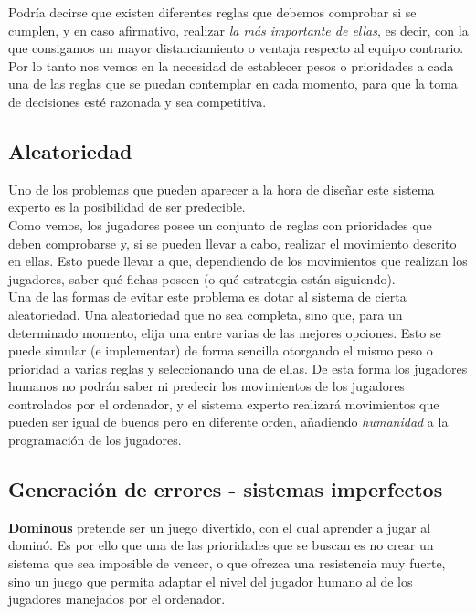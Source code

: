 Podría decirse que existen diferentes reglas que debemos comprobar si se cumplen, y en caso afirmativo, realizar \emph{la
más importante de ellas}, es decir, con la que consigamos un mayor distanciamiento o ventaja respecto al equipo contrario. \\

Por lo tanto nos vemos en la necesidad de establecer pesos o prioridades a cada una de las reglas que se puedan contemplar
en cada momento, para que la toma de decisiones esté razonada y sea competitiva.

\subsection{Aleatoriedad}

Uno de los problemas que pueden aparecer a la hora de diseñar este sistema experto es la posibilidad de ser predecible. \\

Como vemos, los jugadores posee un conjunto de reglas con prioridades que deben comprobarse y, si se pueden llevar a cabo,
realizar el movimiento descrito en ellas. Esto puede llevar a que, dependiendo de los movimientos que realizan los jugadores,
saber qué fichas poseen (o qué estrategia están siguiendo). \\

Una de las formas de evitar este problema es dotar al sistema de cierta aleatoriedad. Una aleatoriedad que no sea completa,
sino que, para un determinado momento, elija una entre varias de las mejores opciones. Esto se puede simular (e implementar) de forma
sencilla otorgando el mismo peso o prioridad a varias reglas y seleccionando una de ellas. De esta forma los jugadores
humanos no podrán saber ni predecir los movimientos de los jugadores controlados por el ordenador, y el sistema experto
realizará movimientos que pueden ser igual de buenos pero en diferente orden, añadiendo \emph{humanidad} a la programación
de los jugadores.

\subsection{Generación de errores - sistemas imperfectos}

\textbf{Dominous} pretende ser un juego divertido, con el cual aprender a jugar al dominó. Es por ello que una de las
prioridades que se buscan es no crear un sistema que sea imposible de vencer, o que ofrezca una resistencia muy fuerte,
sino un juego que permita adaptar el nivel del jugador humano al de los jugadores manejados por el ordenador. \\

